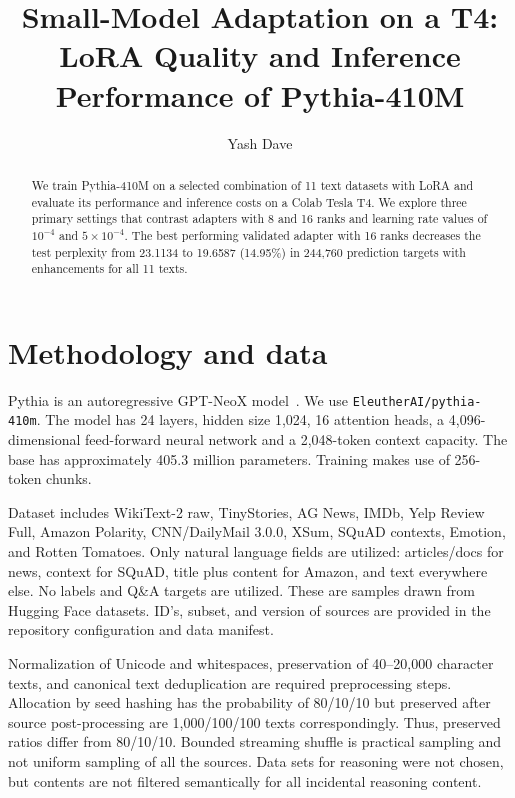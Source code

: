 \documentclass[10pt,a4paper,twocolumn]{article}
\begin{document}
\title{
    Small-Model Adaptation on a T4:\\
    LoRA Quality and Inference Performance of Pythia-410M
}

\author{Yash Dave}

\date{}

\maketitle

\begin{abstract}
We train Pythia-410M on a selected combination of 11 text datasets with LoRA and evaluate its performance and inference costs on a Colab Tesla T4. We explore three primary settings that contrast adapters with 8 and 16 ranks and learning rate values of $10^{-4}$ and $5\times10^{-4}$. The best performing validated adapter with 16 ranks decreases the test perplexity from 23.1134 to 19.6587 (14.95\%) in 244,760 prediction targets with enhancements for all 11 texts.
\end{abstract}

\section{Methodology and data}

Pythia is an autoregressive GPT-NeoX model~\cite{pythia}. We use \texttt{EleutherAI/pythia-410m}. The model has 24 layers, hidden size 1,024, 16 attention heads, a 4,096-dimensional feed-forward neural network and a 2,048-token context capacity. The base has approximately 405.3 million parameters. Training makes use of 256-token chunks.

Dataset includes WikiText-2 raw, TinyStories, AG News, IMDb, Yelp Review Full, Amazon Polarity, CNN/DailyMail 3.0.0, XSum, SQuAD contexts, Emotion, and Rotten Tomatoes. Only natural language fields are utilized: articles/docs for news, context for SQuAD, title plus content for Amazon, and text everywhere else. No labels and Q\&A targets are utilized. These are samples drawn from Hugging Face datasets. ID's, subset, and version of sources are provided in the repository configuration and data manifest.

Normalization of Unicode and whitespaces, preservation of 40--20,000 character texts, and canonical text deduplication are required preprocessing steps. Allocation by seed hashing has the probability of 80/10/10 but preserved after source post-processing are 1,000/100/100 texts correspondingly. Thus, preserved ratios differ from 80/10/10. Bounded streaming shuffle is practical sampling and not uniform sampling of all the sources. Data sets for reasoning were not chosen, but contents are not filtered semantically for all incidental reasoning content.
\end{document}
